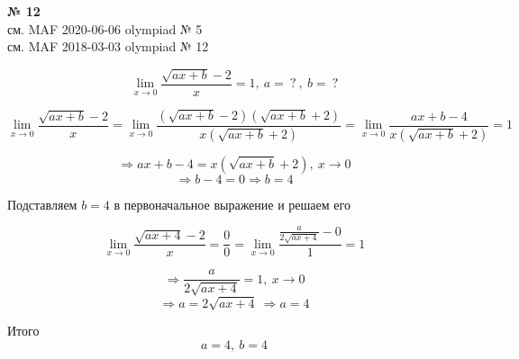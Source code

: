 \documentclass{article}
\begin{document}
\textbf{№ 12} 
\\
см. MAF 2020-06-06 olympiad № 5 \\
см. MAF 2018-03-03 olympiad № 12

$$ \lim\limits_{x \to 0} \frac{\sqrt{ax + b} - 2}{x}
= 1, \ a = \ ? \ , \ b = \ ? $$  

$$ \lim\limits_{x \to 0} \frac{\sqrt{ax + b} - 2}{x}
= \lim\limits_{x \to 0} \frac{\left( \sqrt{ax + b} - 2 \right) \left( \sqrt{ax + b} + 2 \right)}{x\left( \sqrt{ax + b} + 2 \right)} 
= \lim\limits_{x \to 0} \frac{ax+b-4}{x\left( \sqrt{ax + b} + 2 \right)} 
= 1 $$

$$ \Rightarrow ax+b-4 = x(\sqrt{ax+b}+2), \ x \to 0 $$
$$ \Rightarrow b-4 = 0  \Rightarrow b = 4$$

Подставляем $ b = 4 $ в первоначальное выражение и решаем его

$$ \lim\limits_{x \to 0} \frac{\sqrt{ax + 4} - 2}{x} 
= \frac{0}{0} 
= \lim\limits_{x \to 0} \frac{\frac{a}{2\sqrt{ax+4}} - 0}{1} 
= 1 $$

$$ \Rightarrow \frac{a}{2\sqrt{ax+4}} = 1, \ x \to 0 $$
$$ \Rightarrow a = 2\sqrt{ax+4} \ \Rightarrow a = 4 $$

Итого
$$ a = 4, \ b = 4 $$
\end{document}
